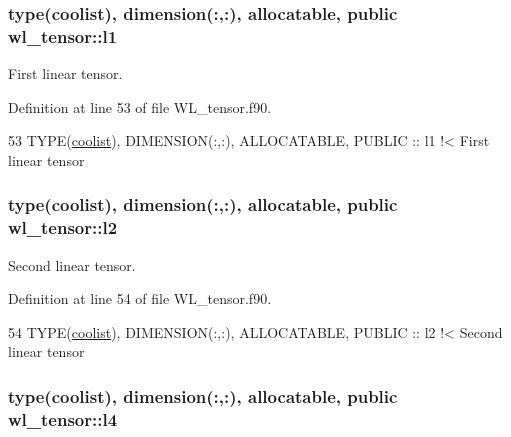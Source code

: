 \subsubsection[{\texorpdfstring{l1}{l1}}]{\setlength{\rightskip}{0pt plus 5cm}type({\bf coolist}), dimension(\+:,\+:), allocatable, public wl\+\_\+tensor\+::l1}\hypertarget{namespacewl__tensor_aa309444c23a52a0e43329bf59cef9b4a}{}\label{namespacewl__tensor_aa309444c23a52a0e43329bf59cef9b4a}


First linear tensor. 



Definition at line 53 of file W\+L\+\_\+tensor.\+f90.


\begin{DoxyCode}
53   \textcolor{keywordtype}{TYPE}(\hyperlink{structtensor_1_1coolist}{coolist}), \textcolor{keywordtype}{DIMENSION(:,:)}, \textcolor{keywordtype}{ALLOCATABLE}, \textcolor{keywordtype}{PUBLIC} :: l1\textcolor{comment}{    !< First linear tensor  }
\end{DoxyCode}
\subsubsection[{\texorpdfstring{l2}{l2}}]{\setlength{\rightskip}{0pt plus 5cm}type({\bf coolist}), dimension(\+:,\+:), allocatable, public wl\+\_\+tensor\+::l2}\hypertarget{namespacewl__tensor_aa4f45dfb65512833eea93c9c49ca94e1}{}\label{namespacewl__tensor_aa4f45dfb65512833eea93c9c49ca94e1}


Second linear tensor. 



Definition at line 54 of file W\+L\+\_\+tensor.\+f90.


\begin{DoxyCode}
54   \textcolor{keywordtype}{TYPE}(\hyperlink{structtensor_1_1coolist}{coolist}), \textcolor{keywordtype}{DIMENSION(:,:)}, \textcolor{keywordtype}{ALLOCATABLE}, \textcolor{keywordtype}{PUBLIC} :: l2\textcolor{comment}{    !< Second linear tensor}
\end{DoxyCode}
\subsubsection[{\texorpdfstring{l4}{l4}}]{\setlength{\rightskip}{0pt plus 5cm}type({\bf coolist}), dimension(\+:,\+:), allocatable, public wl\+\_\+tensor\+::l4}\hypertarget{namespacewl__tensor_ad4231065a820c662308e0bfb85e58bf1}{}\label{namespacewl__tensor_ad4231065a820c662308e0bfb85e58bf1}


